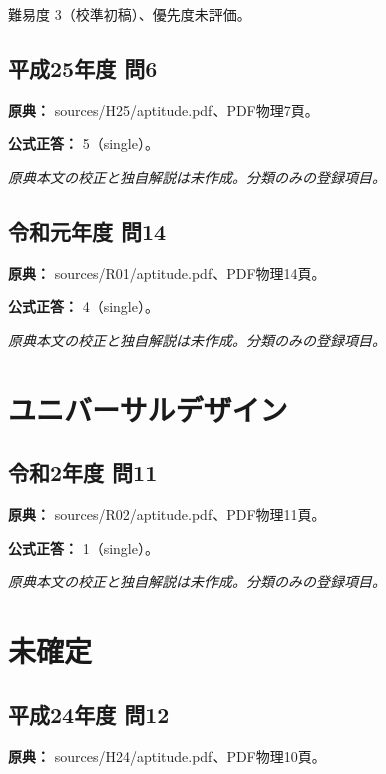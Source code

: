 \par 難易度 3（校準初稿）、優先度未評価。

\subsection{平成25年度 問6}
\label{q:h25-reg-apt-06}

\noindent\textbf{原典：} sources/H25/aptitude.pdf、PDF物理7頁。

\textbf{公式正答：} 5（single）。

\par\textit{原典本文の校正と独自解説は未作成。分類のみの登録項目。}

\subsection{令和元年度 問14}
\label{q:r01-reg-apt-14}

\noindent\textbf{原典：} sources/R01/aptitude.pdf、PDF物理14頁。

\textbf{公式正答：} 4（single）。

\par\textit{原典本文の校正と独自解説は未作成。分類のみの登録項目。}

\section{ユニバーサルデザイン}

\subsection{令和2年度 問11}
\label{q:r02-reg-apt-11}

\noindent\textbf{原典：} sources/R02/aptitude.pdf、PDF物理11頁。

\textbf{公式正答：} 1（single）。

\par\textit{原典本文の校正と独自解説は未作成。分類のみの登録項目。}

\section{未確定}

\subsection{平成24年度 問12}
\label{q:h24-reg-apt-12}

\noindent\textbf{原典：} sources/H24/aptitude.pdf、PDF物理10頁。

